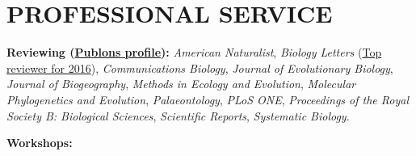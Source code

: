 \documentclass[10pt,a4paper]{article}
\begin{document}
{%


\bigskip


\section{PROFESSIONAL SERVICE}
\raggedright\textbf{Reviewing (\href{https://publons.com/author/640901/thomas-guillerme}{Publons profile}):}
\textit{American Naturalist},
\textit{Biology Letters} (\href{http://blogs.royalsociety.org/publishing/biology-letters-top-reviewers-from-2016/}{Top reviewer for 2016}),
\textit{Communications Biology},
\textit{Journal of Evolutionary Biology},
\textit{Journal of Biogeography},
\textit{Methods in Ecology and Evolution},
\textit{Molecular Phylogenetics and Evolution},
\textit{Palaeontology},
\textit{PLoS ONE},
\textit{Proceedings of the Royal Society B: Biological Sciences},
\textit{Scientific Reports},
\textit{Systematic Biology}.

\bigskip
\raggedright\textbf{Workshops:}

}
\end{document}
